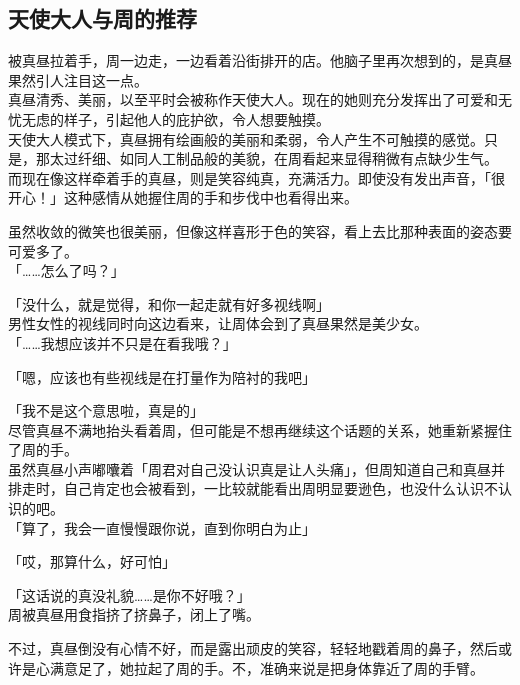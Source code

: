 \subsection{天使大人与周的推荐}

被真昼拉着手，周一边走，一边看着沿街排开的店。他脑子里再次想到的，是真昼果然引人注目这一点。\\

真昼清秀、美丽，以至平时会被称作天使大人。现在的她则充分发挥出了可爱和无忧无虑的样子，引起他人的庇护欲，令人想要触摸。\\

天使大人模式下，真昼拥有绘画般的美丽和柔弱，令人产生不可触摸的感觉。只是，那太过纤细、如同人工制品般的美貌，在周看起来显得稍微有点缺少生气。\\

而现在像这样牵着手的真昼，则是笑容纯真，充满活力。即使没有发出声音，「很开心！」这种感情从她握住周的手和步伐中也看得出来。

虽然收敛的微笑也很美丽，但像这样喜形于色的笑容，看上去比那种表面的姿态要可爱多了。\\

「……怎么了吗？」

「没什么，就是觉得，和你一起走就有好多视线啊」\\

男性女性的视线同时向这边看来，让周体会到了真昼果然是美少女。\\

「……我想应该并不只是在看我哦？」

「嗯，应该也有些视线是在打量作为陪衬的我吧」

「我不是这个意思啦，真是的」\\

尽管真昼不满地抬头看着周，但可能是不想再继续这个话题的关系，她重新紧握住了周的手。\\

虽然真昼小声嘟囔着「周君对自己没认识真是让人头痛」，但周知道自己和真昼并排走时，自己肯定也会被看到，一比较就能看出周明显要逊色，也没什么认识不认识的吧。\\

「算了，我会一直慢慢跟你说，直到你明白为止」

「哎，那算什么，好可怕」

「这话说的真没礼貌……是你不好哦？」\\

周被真昼用食指挤了挤鼻子，闭上了嘴。

不过，真昼倒没有心情不好，而是露出顽皮的笑容，轻轻地戳着周的鼻子，然后或许是心满意足了，她拉起了周的手。不，准确来说是把身体靠近了周的手臂。\\

